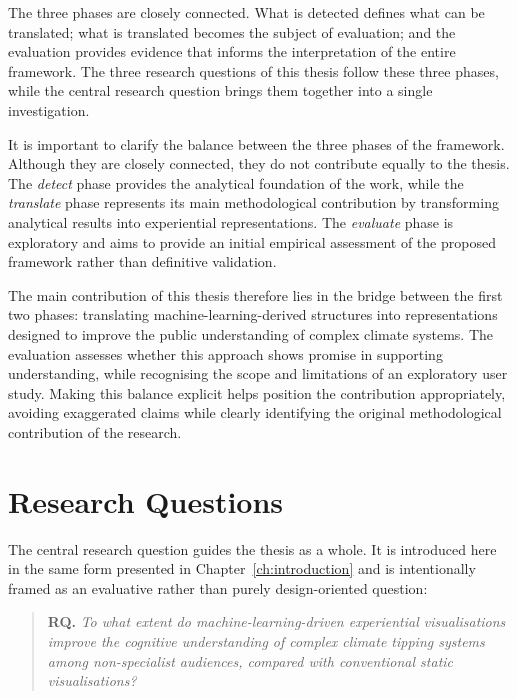 The three phases are closely connected. What is detected defines what can be translated; what is translated becomes the subject of evaluation; and the evaluation provides evidence that informs the interpretation of the entire framework. The three research questions of this thesis follow these three phases, while the central research question brings them together into a single investigation.

It is important to clarify the balance between the three phases of the framework. Although they are closely connected, they do not contribute equally to the thesis. The \emph{detect} phase provides the analytical foundation of the work, while the \emph{translate} phase represents its main methodological contribution by transforming analytical results into experiential representations. The \emph{evaluate} phase is exploratory and aims to provide an initial empirical assessment of the proposed framework rather than definitive validation.

The main contribution of this thesis therefore lies in the bridge between the first two phases: translating machine-learning-derived structures into representations designed to improve the public understanding of complex climate systems. The evaluation assesses whether this approach shows promise in supporting understanding, while recognising the scope and limitations of an exploratory user study. Making this balance explicit helps position the contribution appropriately, avoiding exaggerated claims while clearly identifying the original methodological contribution of the research.

\section{Research Questions}
\label{sec:rqs}

The central research question guides the thesis as a whole. It is introduced here in the same form presented in Chapter~\ref{ch:introduction} and is intentionally framed as an evaluative rather than purely design-oriented question:

\begin{quote}
\textbf{RQ.} \emph{To what extent do machine-learning-driven experiential visualisations improve the cognitive understanding of complex climate tipping systems among non-specialist audiences, compared with conventional static visualisations?}
\end{quote}

